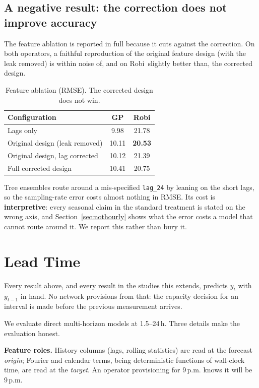 \documentclass[conference]{IEEEtran}
\newcommand{\gpx}{GP}
\newcommand{\robix}{Robi}
\begin{document}
\subsection{A negative result: the correction does not improve accuracy}
\label{sec:ablation}

The feature ablation is reported in full because it cuts against the correction. On
both operators, a faithful reproduction of the original feature design (with the leak
removed) is within noise of, and on \robix\ slightly better than, the corrected design.

\begin{table}[htbp]
\caption{Feature ablation (RMSE). The corrected design does not win.}
\label{tab:ablation}
\centering
\begin{tabular}{lcc}
\toprule
\textbf{Configuration} & \textbf{\gpx} & \textbf{\robix} \\
\midrule
Lags only & 9.98 & 21.78 \\
Original design (leak removed) & 10.11 & \textbf{20.53} \\
Original design, lag corrected & 10.12 & 21.39 \\
Full corrected design & 10.41 & 20.75 \\
\bottomrule
\end{tabular}
\end{table}

Tree ensembles route around a mis-specified \texttt{lag\_24} by leaning on the short
lags, so the sampling-rate error costs almost nothing in RMSE. Its cost is
\textbf{interpretive}: every seasonal claim in the standard treatment is stated on the
wrong axis, and Section~\ref{sec:nothourly} shows what the error costs a model that
cannot route around it. We report this rather than bury it.

\section{Lead Time}
\label{sec:lead}

Every result above, and every result in the studies this extends, predicts $y_t$ with
$y_{t-1}$ in hand. No network provisions from that: the capacity decision for an
interval is made before the previous measurement arrives.

We evaluate direct multi-horizon models at 1.5--24\,h. Three details make the
evaluation honest.

\textbf{Feature roles.} History columns (lags, rolling statistics) are read at the
forecast \emph{origin}; Fourier and calendar terms, being deterministic functions of
wall-clock time, are read at the \emph{target}. An operator provisioning for 9\,p.m.
knows it will be 9\,p.m.
\end{document}
